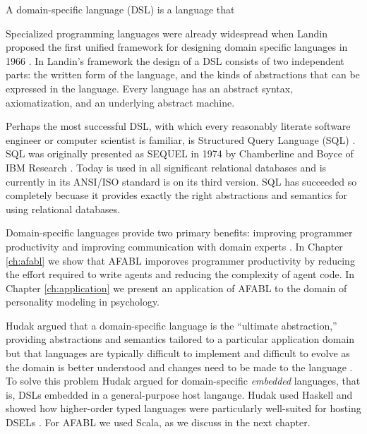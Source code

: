 A domain-specific language (DSL) is a language that

Specialized programming languages were already widespread when Landin proposed the first unified framework for designing domain specific languages in 1966 \cite{landin1966next}. In Landin's framework the design of a DSL consists of two independent parts: the written form of the language, and the kinds of abstractions that can be expressed in the language.
Every language has an abstract syntax, axiomatization, and an underlying abstract machine.



Perhaps the most successful DSL, with which every reasonably literate software engineer or computer scientist is familiar, is Structured Query Language (SQL) \cite{}. SQL was originally presented as SEQUEL in 1974 by Chamberline and Boyce of IBM Research \cite{chamberlin1974sequel}. Today is used in all significant relational databases and is currently in its ANSI/ISO standard is on its third version. SQL has succeeded so completely becuase it provides exactly the right abstractions and semantics for using relational databases.

Domain-specific languages provide two primary benefits: improving programmer productivity and improving communication with domain experts \cite{fowler2011domain}. In Chapter \ref{ch:afabl} we show that AFABL imporoves programmer productivity by reducing the effort required to write agents and reducing the complexity of agent code. In Chapter \ref{ch:application} we present an application of AFABL to the domain of personality modeling in psychology.


Hudak argued that a domain-specific language is the ``ultimate abstraction,'' providing abstractions and semantics tailored to a particular application domain but that languages are typically difficult to implement and difficult to evolve as the domain is better understood and changes need to be made to the language \cite{hudak1996building}. To solve this problem Hudak argued for domain-specific {\it embedded} languages, that is, DSLs embedded in a general-purpose host langauge. Hudak used Haskell and showed how higher-order typed languages were particularly well-suited for hosting DSELs \cite{hudak1998modular}. For AFABL we used Scala, as we discuss in the next chapter.


\cite{taha2008domain-specific}





\cite{dmitriev2004a-language}





